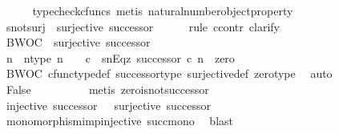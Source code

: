 \begin{isabellebody}
\ \ \ \ \isamarkupfalse%
\ {\isacharparenleft}{\kern0pt}typecheck{\isacharunderscore}{\kern0pt}cfuncs{\isacharcomma}{\kern0pt}\ metis\ natural{\isacharunderscore}{\kern0pt}number{\isacharunderscore}{\kern0pt}object{\isacharunderscore}{\kern0pt}property{\isacharparenright}{\kern0pt}\ \ \ \ \isanewline
\ \ \isamarkupfalse%
\ s{\isacharunderscore}{\kern0pt}not{\isacharunderscore}{\kern0pt}surj{\isacharcolon}{\kern0pt}\ {\isachardoublequoteopen}{\isasymnot}\ surjective\ successor{\isachardoublequoteclose}\isanewline
\ \ \ \ \isamarkupfalse%
\ {\isacharparenleft}{\kern0pt}rule\ ccontr{\isacharcomma}{\kern0pt}\ clarify{\isacharparenright}{\kern0pt}\isanewline
\ \ \ \ \ \ \isamarkupfalse%
\ BWOC\ {\isacharcolon}{\kern0pt}\ {\isachardoublequoteopen}surjective\ successor{\isachardoublequoteclose}\isanewline
\ \ \ \ \ \ \isamarkupfalse%
\ n\ \ n{\isacharunderscore}{\kern0pt}type{\isacharcolon}{\kern0pt}\ {\isachardoublequoteopen}n\ {\isacharcolon}{\kern0pt}\ {\isasymone}\ {\isasymrightarrow}\ {\isasymnat}\isactrlsub c{\isachardoublequoteclose}\ \ snEqz{\isacharcolon}{\kern0pt}\ {\isachardoublequoteopen}successor\ {\isasymcirc}\isactrlsub c\ n\ {\isacharequal}{\kern0pt}\ zero{\isachardoublequoteclose}\isanewline
\ \ \ \ \ \ \ \ \isamarkupfalse%
\ BWOC\ cfunc{\isacharunderscore}{\kern0pt}type{\isacharunderscore}{\kern0pt}def\ successor{\isacharunderscore}{\kern0pt}type\ surjective{\isacharunderscore}{\kern0pt}def\ zero{\isacharunderscore}{\kern0pt}type\ \isamarkupfalse%
\ auto\isanewline
\ \ \ \ \ \ \isamarkupfalse%
\ \isamarkupfalse%
\ False\isanewline
\ \ \ \ \ \ \ \ \isamarkupfalse%
\ {\isacharparenleft}{\kern0pt}metis\ zero{\isacharunderscore}{\kern0pt}is{\isacharunderscore}{\kern0pt}not{\isacharunderscore}{\kern0pt}successor{\isacharparenright}{\kern0pt}\isanewline
\ \ \ \ \isamarkupfalse%
\isanewline
\ \ \isamarkupfalse%
\ \isamarkupfalse%
\ {\isachardoublequoteopen}injective\ successor\ {\isasymand}\ {\isasymnot}\ surjective\ successor{\isachardoublequoteclose}\isanewline
\ \ \ \ \isamarkupfalse%
\ monomorphism{\isacharunderscore}{\kern0pt}imp{\isacharunderscore}{\kern0pt}injective\ succ{\isacharunderscore}{\kern0pt}mono\ \isamarkupfalse%
\ blast\isanewline
{}\isamarkupfalse%
%
\endisatagproof
{\isafoldproof}%
%
\isadelimproof
\isanewline
%
\endisadelimproof
\isanewline

\end{isabellebody}
